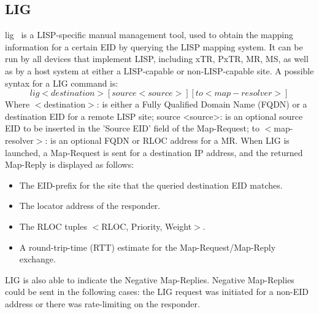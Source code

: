 \subsection{LIG}
\label{subsec:implementation_lig}
\acrfull{lig}~\cite{rfc6835} is a LISP-specific manual management tool, used to obtain the mapping information for a certain EID by querying the LISP mapping system. It can be run by all devices that implement LISP, including xTR, PxTR, MR, MS, as well as by a host system at either a LISP-capable or non-LISP-capable site. A possible syntax for a LIG command is:
\begin{equation}
lig <destination> [source <source>] [to <map-resolver>] \nonumber
\end{equation}
Where $<$destination$>$: is either a Fully Qualified Domain Name (FQDN) or a destination EID for a remote LISP site; source <source>: is an optional source EID to be inserted in the 'Source EID' field of the Map-Request; to $<$map-resolver$>$: is an optional FQDN or RLOC address for a MR. When LIG is launched, a Map-Request is sent for a destination IP address, and the returned Map-Reply is displayed as follows:
\begin{itemize}[noitemsep,topsep=0pt]
    \item The EID-prefix for the site that the queried destination EID matches.
    \item The locator address of the responder.
    \item The RLOC tuples $<$RLOC, Priority, Weight$>$.
    \item A round-trip-time (RTT) estimate for the Map-Request/Map-Reply exchange.
\end{itemize}

LIG is also able to indicate the Negative Map-Replies. Negative Map-Replies could be sent in the following cases: the LIG request was initiated for a non-EID address or there was rate-limiting on the responder.

